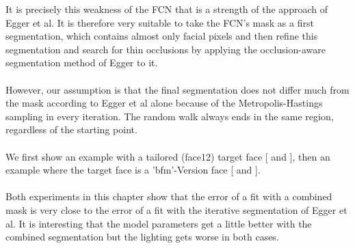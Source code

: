 It is precisely this weakness of the FCN that is a strength of the approach of Egger et al. It is therefore very suitable to take the FCN's mask as a first segmentation, which contains almost only facial pixels and then refine this segmentation and search for thin occlusions by applying the occlusion-aware segmentation method of Egger to it.\\
\\
However, our assumption is that the final segmentation does not differ much from the mask according to Egger et al alone because of the Metropolis-Hastings sampling in every iteration. The random walk always ends in the same region, regardless of the starting point.\\
\\
We first show an example with a tailored (face12) target face [ and ], then an example where the target face is a 'bfm'-Version face [ and ]. \\
\\
Both experiments in this chapter show that the error of a fit with a combined mask is very close to the error of a fit with the iterative segmentation of Egger et al. It is interesting that the model parameters get a little better with the combined segmentation but the lighting gets worse in both cases.\\

\pagebreak

